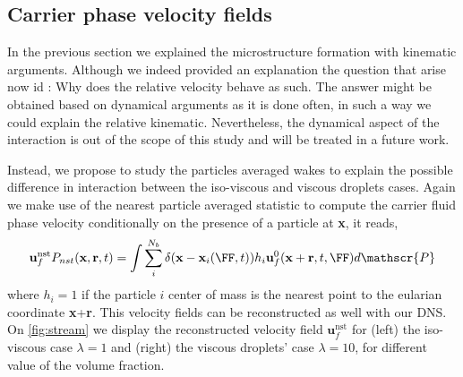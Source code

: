 \subsection{Carrier phase velocity fields}

In the previous section we explained the microstructure formation with kinematic arguments.
Although we indeed provided an explanation the question that arise now id :
Why does the relative velocity behave as such.
The answer might be obtained based on dynamical arguments as it is done often, in such a way we could explain the relative kinematic.
Nevertheless, the dynamical aspect of the interaction is out of the scope of this study and will be treated in a future work. 

Instead, we propose to study the particles averaged wakes to explain the possible difference in interaction between the iso-viscous and viscous droplets cases. 
Again we make use of the nearest particle averaged statistic to compute the carrier fluid phase velocity conditionally on the presence of a particle at \textbf{x}, it reads,
\begin{equation*}
    \textbf{u}^\text{nst}_f P_{nst}(\textbf{x},\textbf{r},t)= 
    \int \sum_{i}^{N_b} \delta(\textbf{x}-\textbf{x}_i(\FF,t))
    h_{i} 
    \textbf{u}_f^0(\textbf{x}+\textbf{r},t,\FF)
    d\mathscr{P} 
\end{equation*}
where $h_{i} = 1$ if the particle $i$ center of mass is the nearest point to the eularian coordinate \textbf{x}+\textbf{r}. 
This velocity fields can be reconstructed as well with our DNS. 
On \ref{fig:stream} we display the reconstructed velocity field $\textbf{u}^\text{nst}_f$ for (left) the iso-viscous case $\lambda =1$ and (right) the viscous droplets' case $\lambda = 10$, for different value of the volume fraction. 
